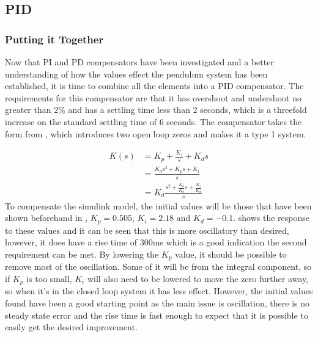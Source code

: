 \documentclass[a4paper, 11pt, compsoc]{IEEEtran}
\begin{document}
		\subsection{PID}\label{sec:pid}
			\subsubsection{Putting it Together}\label{sec:pidtune}
				Now that PI and PD compensators have been investigated and a better understanding of how the values effect the pendulum system has been established, it is time to combine all the elements into a PID compensator. The requirements for this compensator are that it has overshoot and undershoot no greater than 2\% and has a settling time less than 2 seconds, which is a threefold increase on the standard settling time of 6 seconds. The compensator takes the form from , which introduces two open loop zeros and makes it a type 1 system. 
				\par
				\begin{equation}
					\label{eq:pideq}
					\begin{split}
						K(s) & = K_p + \frac{K_i}{s} + K_ds\\
							 & = \frac{K_ds^2 + K_ps + K_i}{s}\\
							 & = K_d\frac{s^2 +\frac{K_p}{K_d}s + \frac{K_i}{K_d}}{s}
					\end{split}
				\end{equation}
				To compensate the simulink model, the initial values will be those that have been shown beforehand in , $K_p = 0.505$, $K_i = 2.18$ and $K_d = -0.1$.  shows the response to these values and it can be seen that this is more oscillatory than desired, however, it does have a rise time of 300ms which is a good indication the second requirement can be met. By lowering the $K_p$ value, it should be possible to remove most of the oscillation. Some of it will be from the integral component, so if $K_p$ is too small, $K_i$ will also need to be lowered to move the zero further away, so when it's in the closed loop system it has less effect. However, the initial values found have been a good starting point as the main issue is oscillation, there is no steady state error and the rise time is fast enough to expect that it is possible to easily get the desired improvement. 
	
\end{document}
